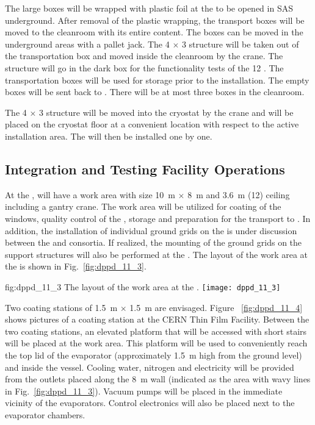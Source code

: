 The large  boxes will be wrapped with plastic foil at the  to be opened in SAS underground. After removal of the plastic wrapping, the transport boxes will be moved to the cleanroom with its entire content. The  boxes can be moved in the underground areas with a pallet jack. The \num{4} $\times$ \num{3} structure will be taken out of the transportation box and moved inside the cleanroom by the crane. The structure will go in the dark box for the functionality tests of the \num{12} . The transportation boxes will be used for storage prior to the installation. The empty boxes will be sent back to . There will be at most three  boxes in the cleanroom.

The \num{4} $\times$ \num{3} structure will be moved into the cryostat by the crane and will be placed on the cryostat floor at a convenient location with respect to the active installation area. The  will then be installed one by one. 

\subsection{Integration and Testing Facility Operations}
\label{subsec:dp-pds-itf}

At the ,  will have a work area with size \SI{10}{\m} $\times$ \SI{8}{\m} and \SI{3.6}{\m} (\SI{12}{\ft}) ceiling including a gantry crane. The work area will be utilized for  coating of the  windows, quality control of the , storage and preparation for the transport to \surf. In addition, the installation of individual ground grids on the  is under discussion between the  and  consortia. If realized, the mounting of the ground grids on the  support structures will also be performed at the . The layout of the  work area at the  is shown in Fig.~\ref{fig:dppd_11_3}.

\begin{dunefigure}{fig:dppd_11_3}
{The layout of the  work area at the .}
\texttt{[image: dppd\_11\_3]}
\end{dunefigure}

Two coating stations of \SI{1.5}{\m} $\times$ \SI{1.5}{\m} are envisaged. Figure ~\ref{fig:dppd_11_4} shows pictures of a  coating station at the CERN Thin Film Facility. Between the two coating stations, an elevated platform that will be accessed with short stairs will be placed at the   work area. This platform will be used to conveniently reach the top lid of the evaporator (approximately \SI{1.5}{\m} high from the ground level) and inside the vessel. Cooling water, nitrogen and electricity will be provided from the outlets placed along the \SI{8}{\m} wall (indicated as the area with wavy lines in Fig.~\ref{fig:dppd_11_3}). Vacuum pumps will be placed in the immediate vicinity of the evaporators. Control electronics will also be placed next to the evaporator chambers. 

